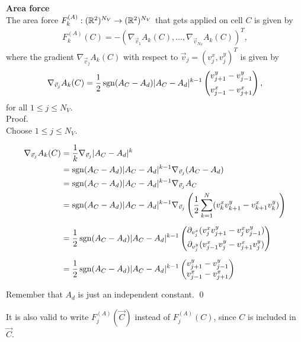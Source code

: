 \begin{proposition} \textbf{Area force} \label{force:area}\\
	The area force $F_{k}^{(A)}: (\mathbb{R}^2)^{N_V} \rightarrow (\mathbb{R}^2)^{N_V}$ that gets applied on cell $C$ is given by  
	\begin{align*}
		F_{k}^{(A)}(C) 
		= - (\nabla_{\vec{v}_1} A_k(C), \ldots, \nabla_{\vec{v}_{N_V}} A_k(C))^T,
	\end{align*}
	where the gradient $\nabla_{\vec{v}_j} A_k(C)$ with respect to $\vec{v}_j = (v_{j}^{x}, v_{j}^{y})^T$ is given by 
	\begin{align}
		\nabla_{\vec{v}_j} A_k(C) = \dfrac{1}{2} \operatorname{sgn}(A_{C} - A_d) |A_{C} - A_d|^{k-1} \begin{pmatrix} v_{j+1}^{y} - v_{j-1}^{y} \\[0.5em]  v_{j-1}^{x} - v_{j+1}^{x} \end{pmatrix},
		\label{gradient:area}
	\end{align}
	for all $1 \leq j \leq N_V$.\\


	Proof.\\
	Choose $1 \leq j \leq N_V$.  
 
	\begin{align*}
		\nabla_{\vec{v}_j} A_k(C) &= \frac{1}{k} \nabla_{\vec{v}_j} | A_{C} - A_d |^k  \\ 
		&= \operatorname{sgn}(A_{C} - A_d) | A_{C} - A_d |^{k-1} \nabla_{\vec{v}_j} (A_{C} - A_d) \\
		&= \operatorname{sgn}(A_{C} - A_d) | A_{C} - A_d |^{k-1} \nabla_{\vec{v}_j} A_{C} \\
		&= \operatorname{sgn}(A_{C} - A_d) | A_{C} - A_d |^{k-1} \nabla_{\vec{v}_j} \left(\frac{1}{2} \sum\limits_{k = 1}^{N} (v_k^{x} v_{k+1}^{y} - v_{k+1}^{x} v_k^{y})\right) \\[0.5em]  
		&= \frac{1}{2} \operatorname{sgn}(A_{C} - A_d) | A_{C} - A_d |^{k-1} \begin{pmatrix}
				\partial_{v_j^{x}} (v_j^{x} v_{j+1}^{y} - v_j^{x} v_{j-1}^{y})  \\[0.5em]
				\partial_{v_j^{y}} (v_{j-1}^{x} v_j^{y} - v_{j+1}^{x} v_j^{y})
			\end{pmatrix} \\[0.5em] 
		&= \frac{1}{2} \operatorname{sgn}(A_{C} - A_d) | A_{C} - A_d |^{k-1} \begin{pmatrix}
				v_{j+1}^{y} - v_{j-1}^{y}  \\
				v_{j-1}^{x}  - v_{j+1}^{x} 
			\end{pmatrix} 
	\end{align*}

	Remember that $A_d$ is just an independent constant. 
	\qed
\end{proposition}
It is also valid to write $F_{j}^{(A)}(\vec{C})$ instead of $F_{j}^{(A)}(C)$, since $C$ is included in $\vec{C}$. 


